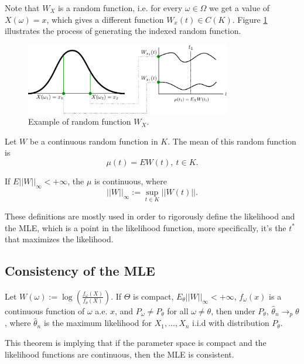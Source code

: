 Note that $W_X$ is a random function, i.e. for every $\omega \in \Omega$ we
get a value of $X(\omega)=x$, which gives a different function $W_x(t) \in C(K)$.
Figure \ref{fig:randomfunction} illustrates the process of generating the
indexed random function.

\begin{figure}[H]
	\begin{center}
		\includegraphics[width=0.8\textwidth]{./figures/randomfunction.pdf}
	\end{center}
	\caption{Example of random function $W_X$.}
	\label{fig:randomfunction}
\end{figure}

\begin{definition}
	Let $W$ be a continuous random function in $K$. The mean of this
	random function is
	\begin{equation}
		\mu(t) = EW(t), \ t \in K.
	\end{equation}
\end{definition}

\begin{lemma}
	If $E||W||_{\infty} < +\infty$, the $\mu$ is continuous, where
	\begin{equation}
		||W||_{\infty} := \sup_{t \in K} || W(t) ||.
	\end{equation}
\end{lemma}

These definitions are mostly used in order to rigorously define
the likelihood and the MLE, which is a point in the likelihood function,
more specifically, it's the $t^*$ that maximizes the likelihood.

\subsection{Consistency of the MLE}

\begin{theorem}
	Let $W(\omega):=\log\left(\frac{f_\omega(X)}{f_\theta(X)}\right)$.
	If $\Theta$ is compact, $E_\theta ||W||_\infty < +\infty$, $f_{\omega}(x)$
	is a continuous function of $\omega$ a.e. $x$, and $P_\omega \neq P_\theta$
	for all $\omega \neq \theta$, then under $P_\theta$, $\hat \theta_n \to_p \theta$,
	where $\hat\theta_n$ is the maximum likelihood for $X_1,...,X_n$ i.i.d with
	distribution $P_\theta$.

	This theorem is implying that if the parameter space is compact and
	the likelihood functions are continuous, then the MLE is consistent.
\end{theorem}

